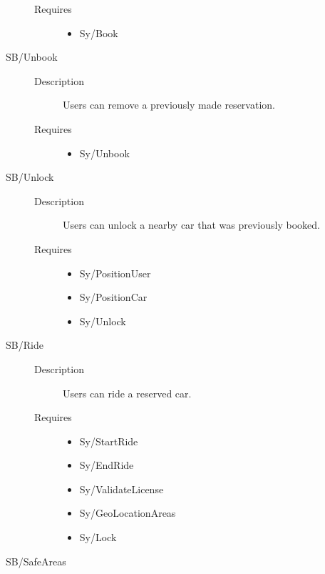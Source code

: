 \documentclass[11pt]{article} %
\begin{document}
\begin{description}
\begin{description}
		\item[Requires] \hfill
		\begin{itemize}
			\item Sy/Book %
		\end{itemize}
	\end{description}
	\item[SB/Unbook] \hfill
	\begin{description}
		\item[Description] Users can remove a previously made reservation.
		\item[Requires] \hfill
		\begin{itemize}
			\item Sy/Unbook %
		\end{itemize}
	\end{description}
	\item[SB/Unlock] \hfill
	\begin{description}
		\item[Description] Users can unlock a nearby car that was previously booked.
		\item[Requires] \hfill
		\begin{itemize}
			\item Sy/PositionUser %
			\item Sy/PositionCar %
			\item Sy/Unlock %
		\end{itemize}
	\end{description}
	\item[SB/Ride] \hfill
	\begin{description}
		\item[Description] Users can ride a reserved car.
		\item[Requires] \hfill
		\begin{itemize}
			\item Sy/StartRide %
			\item Sy/EndRide %
			\item Sy/ValidateLicense %
			\item Sy/GeoLocationAreas %
			\item Sy/Lock %
		\end{itemize}
	\end{description}
	\item[SB/SafeAreas] \hfill

\end{description}
\end{document}
